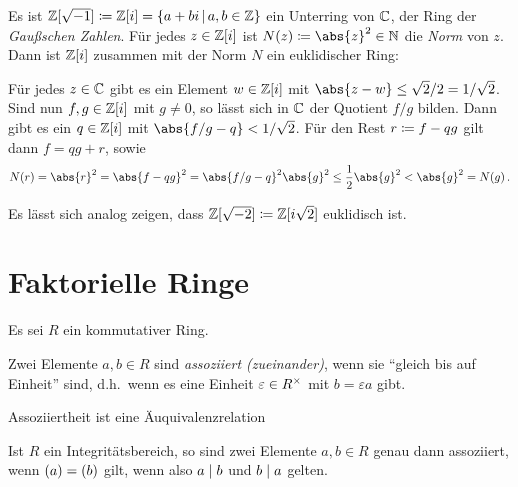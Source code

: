 \begin{example}
  Es ist $\Integer[\sqrt{-1}] \defined \Integer[i] = \{a + bi \suchthat a, b \in \Integer\}$ ein Unterring von $\mathbb{C}$, der Ring der \emph{Gaußschen Zahlen}.
  Für jedes $z \in \mathbb{Z}[i]$ ist $N(z) \defined \abs{z}^2 \in \Natural$ die \emph{Norm} von $z$.
  Dann ist $\mathbb{Z}[i]$ zusammen mit der Norm $N$ ein euklidischer Ring:
  
  Für jedes $z \in \mathbb{C}$ gibt es ein Element $w \in \mathbb{Z}[i]$ mit $\abs{z-w} \leq \sqrt{2}/2 = 1/\sqrt{2}$.
  Sind nun $f, g \in \mathbb{Z}[i]$ mit $g \neq 0$, so lässt sich in $\mathbb{C}$ der Quotient $f/g$ bilden.
  Dann gibt es ein $q \in \mathbb{Z}[i]$ mit $\abs{f/g - q} < 1/\sqrt{2}$.
  Für den Rest $r \coloneqq f - qg$ gilt dann $f = qg + r$, sowie
  \[
          N(r)
    =     \abs{r}^2
    =     \abs{f - qg}^2
    =     \abs{f/g - q}^2 \abs{g}^2
    \leq  \frac{1}{2} \abs{g}^2
    <     \abs{g}^2
    =     N(g) \,.
  \]
\end{example}

\begin{remark}
  Es lässt sich analog zeigen, dass $\mathbb{Z}[\sqrt{-2}] \coloneqq \mathbb{Z}[i\sqrt{2}]$ euklidisch ist.
\end{remark}





\section{Faktorielle Ringe}

Es sei $R$ ein kommutativer Ring.

\begin{definition}
  Zwei Elemente $a, b \in R$ sind \emph{assoziiert \textup(zueinander\textup)}, wenn sie \enquote{gleich bis auf Einheit} sind, d.h.\ wenn es eine Einheit $\varepsilon \in R^{\times}$ mit $b = \varepsilon a$ gibt.
\end{definition}

\begin{lemma}
  Assoziiertheit ist eine Äuquivalenzrelation
\end{lemma}

\begin{lemma}
  Ist $R$ ein Integritätsbereich, so sind zwei Elemente $a, b \in R$ genau dann assoziiert, wenn $(a) = (b)$ gilt, wenn also $a \mathrel{|} b$ und $b \mathrel{|} a$ gelten.
\end{lemma}

